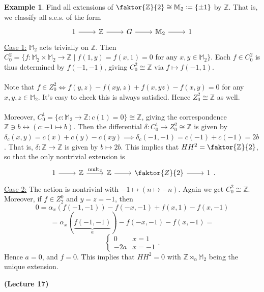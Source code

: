 \documentclass[10pt,letterpaper,cm]{nupset}
\theoremstyle{definition}
\newtheorem{exmp}{Example}
\newcommand{\M}{\mathbb M}
\newcommand{\Z}{\mathbb Z}
\newcommand{\1}{\mathbf{1}}
\newcommand{\0}{\vec 0}
\begin{document}
\begin{exmp}
Find all extensions of $\faktor{\Z}{2}\cong \M_2 \coloneqq  \{\pm1\}$ by $\Z$. That is, we classify all s.e.s. of the form
\[
\begin{tikzcd}
1 \arrow[r] & \Z \arrow[r] & G \arrow[r] & \M_2 \arrow[r] & 1
\end{tikzcd}
\]
\underline{Case 1:} $\M_2$ acts trivially on $\Z$. Then $C^2_0 = \{f : \M_2 \times \M_2 \to \Z \mid f(1, y) = f(x, 1) = 0$ for any $x,y \in \M_2 \}$. Each $f \in C^2_0$ is thus determined by $f(-1, -1)$, giving $C^2_0 \cong \Z$ via $f\mapsto f(-1, 1)$.
\\ \\ Note that $f\in Z^2_0 \iff f(y, z)-f(xy, z)+f(x, yz)-f(x, y) =0$ for any $x, y, z\in \M_2$. It's easy to check this is always satisfied. Hence $Z^2_0 \cong \Z$ as well. 
\\ \\ Moreover, $C^1_0 = \{c : \M_2 \to \Z : c(1) =0\} \cong \Z$, giving the correspondence $\Z \ni b \longleftrightarrow (c: -1 \mapsto b)$. Then the differential $\delta : C^1_0 \to Z^2_0\cong \Z$ is given by $\delta_c(x, y) = c(x)+c(y) -c(xy)\implies \delta_c(-1, -1) = c(-1) + c(-1) = 2b$. That is, $\delta : \Z \to \Z$ is given by $b \mapsto 2b$. This implies that $HH^2 = \faktor{\Z}{2}$, so that the only nontrivial extension is
\[
\begin{tikzcd}
1 \arrow[r] & \Z \arrow[r, "\text{mult}_2"] & \Z \arrow[r] & \faktor{Z}{2} \arrow[r] & 1
\end{tikzcd}.
\]
\underline{Case 2:} The action is nontrivial with $-1 \mapsto (n \mapsto -n)$.  Again we get $C^2_0 \cong \Z$. Moreover, if $f\in Z_2^0$ and $y= z = -1$, then $$0 = \alpha_x(f(-1, -1)) - f(-x, -1)+ f(x, 1)- f(x, -1)$$ $$= \alpha_x(\underbrace{f(-1, -1)}_a) - f(-x, -1)- f(x, -1) = $$
\[
\begin{cases}
0 & x =1 \\
-2a & x = -1
\end{cases}.
\]
Hence $a = 0$, and $f = 0$. This implies that $HH^2 = 0$ with $\Z \rtimes_{\alpha} \M_2$ being the unique extension. 
\end{exmp}

\begin{center}
{\textbf{(Lecture 17)}}
\end{center}
\end{document}
